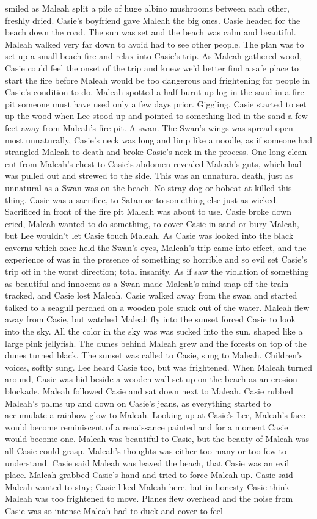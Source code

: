 \documentclass[12pt]{book}
\begin{document}
smiled as Maleah split a pile of huge albino mushrooms between each other, freshly dried. Casie's boyfriend gave Maleah the big ones. Casie headed for the beach down the road. The sun was set and the beach was calm and beautiful. Maleah walked very far down to avoid had to see other people. The plan was to set up a small beach fire and relax into Casie's trip. As Maleah gathered wood, Casie could feel the onset of the trip and knew we'd better find a safe place to start the fire before Maleah would be too dangerous and frightening for people in Casie's condition to do. Maleah spotted a half-burnt up log in the sand in a fire pit someone must have used only a few days prior. Giggling, Casie started to set up the wood when Lee stood up and pointed to something lied in the sand a few feet away from Maleah's fire pit. A swan. The Swan's wings was spread open most unnaturally, Casie's neck was long and limp like a noodle, as if someone had strangled Maleah to death and broke Casie's neck in the process. One long clean cut from Maleah's chest to Casie's abdomen revealed Maleah's guts, which had was pulled out and strewed to the side. This was an unnatural death, just as unnatural as a Swan was on the beach. No stray dog or bobcat at killed this thing. Casie was a sacrifice, to Satan or to something else just as wicked. Sacrificed in front of the fire pit Maleah was about to use. Casie broke down cried, Maleah wanted to do something, to cover Casie in sand or bury Maleah, but Lee wouldn't let Casie touch Maleah. As Casie was looked into the black caverns which once held the Swan's eyes, Maleah's trip came into effect, and the experience of was in the presence of something so horrible and so evil set Casie's trip off in the worst direction; total insanity. As if saw the violation of something as beautiful and innocent as a Swan made Maleah's mind snap off the train tracked, and Casie lost Maleah. Casie walked away from the swan and started talked to a seagull perched on a wooden pole stuck out of the water. Maleah flew away from Casie, but watched Maleah fly into the sunset forced Casie to look into the sky. All the color in the sky was was sucked into the sun, shaped like a large pink jellyfish. The dunes behind Maleah grew and the forests on top of the dunes turned black. The sunset was called to Casie, sung to Maleah. Children's voices, softly sung. Lee heard Casie too, but was frightened. When Maleah turned around, Casie was hid beside a wooden wall set up on the beach as an erosion blockade. Maleah followed Casie and sat down next to Maleah. Casie rubbed Maleah's palms up and down on Casie's jeans, as everything started to accumulate a rainbow glow to Maleah. Looking up at Casie's Lee, Maleah's face would become reminiscent of a renaissance painted and for a moment Casie would become one. Maleah was beautiful to Casie, but the beauty of Maleah was all Casie could grasp. Maleah's thoughts was either too many or too few to understand. Casie said Maleah was leaved the beach, that Casie was an evil place. Maleah grabbed Casie's hand and tried to force Maleah up. Casie said Maleah wanted to stay; Casie liked Maleah here, but in honesty Casie think Maleah was too frightened to move. Planes flew overhead and the noise from Casie was so intense Maleah had to duck and cover to feel 
\end{document}
